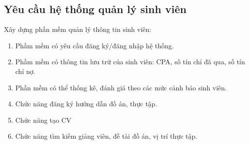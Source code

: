 \documentclass[12pt, a4paper]{report}
\begin{document}
    \subsection{Yêu cầu hệ thống quản lý sinh viên}
        Xây dựng phần mềm quản lý thông tin sinh viên:
        \begin{enumerate}
            \item Phầm mềm có yêu cầu đăng ký/đăng nhập hệ thống.
            \item Phầm mềm có thông tin lưu trữ của sinh viên: CPA, số tín chỉ đã qua, số tín chỉ nợ.
            \item Phần mềm có thể thống kê, đánh giá theo các mức cảnh báo sinh viên.
            \item Chức năng đăng ký hướng dẫn đồ án, thực tập.
            \item Chức năng tạo CV
            \item Chức năng tìm kiếm giảng viên, đề tài đồ án, vị trí thực tập.
        \end{enumerate}
    
\end{document}
